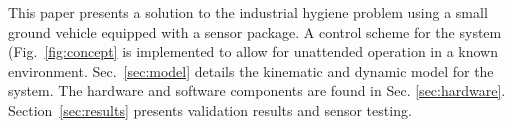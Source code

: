 This paper presents a solution to the industrial hygiene problem using a small ground vehicle equipped with a sensor package. A control scheme for the system (Fig.~\ref{fig:concept} is implemented to allow for unattended operation in a known environment. Sec.~\ref{sec:model} details the kinematic and dynamic model for the system. The hardware and software components are found in Sec. \ref{sec:hardware}. Section~\ref{sec:results} presents validation results and sensor testing.